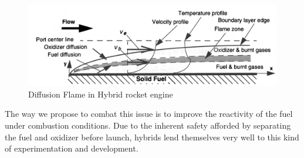 \begin{figure}
    \centering
    \includegraphics[width=1\linewidth]{Figures/diffusionFlame.png}
    \caption{Diffusion Flame in Hybrid rocket engine\cite{HumbleHybrid}}
    \label{fig:placeholder}
\end{figure}

The way we propose to combat this issue is to improve the reactivity of the fuel under combustion conditions. Due to the inherent safety afforded by separating the fuel and oxidizer before launch, hybrids lend themselves very well to this kind of experimentation and development. 